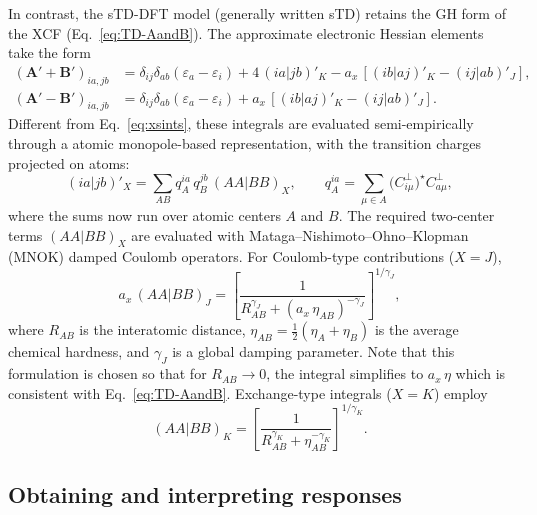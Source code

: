 \documentclass[%
 aip,
 amsmath,amssymb,
preprint,%
]{revtex4-2}
\begin{document}
In contrast, the sTD-DFT model (generally written sTD) retains the GH form of the XCF (Eq.~\eqref{eq:TD-AandB}).  
The approximate electronic Hessian elements take the form\cite{grimmeSimplifiedTammDancoffDensity2013,bannwarthSimplifiedTimedependentDensity2014}
\begin{align}
	(\mathbf A'+ \mathbf B')_{ia,jb} &= \delta_{ij}\delta_{ab} (\varepsilon_a - \varepsilon_i)
	+ 4\,(ia|jb)'_K - a_x\,[(ib|aj)'_K-(ij|ab)'_J], \nonumber\\
	(\mathbf A' - \mathbf B')_{ia,jb} &= \delta_{ij}\delta_{ab} (\varepsilon_a - \varepsilon_i) + a_x\,[(ib|aj)'_K-(ij|ab)'_J ].
	\label{eq:stddft}
\end{align}
Different from Eq.~\eqref{eq:xsints}, these integrals are evaluated semi-empirically through a atomic monopole-based representation,  with the transition charges projected on atoms:
\begin{equation}
	(ia|jb)'_X = \sum_{AB} q_A^{ia}\,q_B^{jb}\,(AA|BB)_X, 
	\qquad 
	q_A^{ia} = \sum_{\mu \in A} \big(C^{\perp}_{i\mu}\big)^\star C^{\perp}_{a\mu},
	\label{eq:sints}
\end{equation}
where the sums now run over atomic centers $A$ and $B$.  
The required two-center terms $(AA|BB)_X$ are evaluated with Mataga--Nishimoto--Ohno--Klopman (MNOK) damped Coulomb operators.\cite{klopmanSemiempiricalTreatmentMolecular1964}  
For Coulomb-type contributions ($X=J$),
\begin{equation*}
	a_x\,(AA|BB)_J =
	\left[\frac{1}{R_{AB}^{\gamma_J} + \left(a_x\,\eta_{AB}\right)^{-\gamma_J}}\right]^{1/\gamma_J},
\end{equation*}
where $R_{AB}$ is the interatomic distance, $\eta_{AB} = \tfrac{1}{2}(\eta_A + \eta_B)$ is the average chemical hardness, and $\gamma_J$ is a global damping parameter.  
Note that this formulation is chosen so that for $R_{AB}\to 0$, the integral simplifies to $a_x\,\eta$ which is consistent with Eq.~\eqref{eq:TD-AandB}.\cite{grimmeSimplifiedTammDancoffDensity2013}
Exchange-type integrals ($X=K$) employ
\begin{equation*}
	(AA|BB)_K =
	\left[\frac{1}{R_{AB}^{\gamma_K} + \eta_{AB}^{-\gamma_K}}\right]^{1/\gamma_K}.
\end{equation*}



\subsection{Obtaining and interpreting responses}
\end{document}
